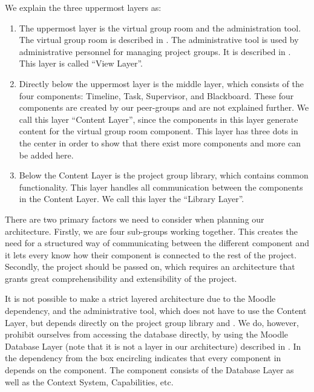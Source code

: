 We explain the three uppermost layers as:
\begin{enumerate}
	\item The uppermost layer is the virtual group room and the administration tool.
	The virtual group room is described in .
	The administrative tool is used by administrative personnel for managing project groups.
	It is described in .
	This layer is called ``View Layer''.
	\item Directly below the uppermost layer is the middle layer, which consists of the four components: Timeline, Task, Supervisor, and Blackboard.
	These four components are created by our peer-groups and are not explained further.
	We call this layer ``Content Layer'', since the components in this layer generate content for the virtual group room component.
	This layer has three dots in the center in order to show that there exist more components and more can be added here. 
	\item Below the Content Layer is the project group library, which contains common functionality.
	This layer handles all communication between the components in the Content Layer.  
	We call this layer the ``Library Layer''.
\end{enumerate}


There are two primary factors we need to consider when planning our architecture. 
Firstly, we are four sub-groups working together. 
This creates the need for a structured way of communicating between the different component and it lets every \subgroup{} know how their component is connected to the rest of the project. 
Secondly, the project should be passed on, which requires an architecture that grants great comprehensibility and extensibility of the project.

It is not possible to make a strict layered architecture due to the Moodle dependency, and the administrative tool, which does not have to use the Content Layer, but depends directly on the project group library and \moodle{}.
We do, however, prohibit ourselves from accessing the database directly, by using the Moodle Database Layer (note that it is not a layer in our architecture) described in .
In  the dependency from the box encircling \system{} indicates that every component in \system{} depends on the \moodle{} component.
The \moodle{} component consists of the Database Layer as well as the Context System, Capabilities, etc.

